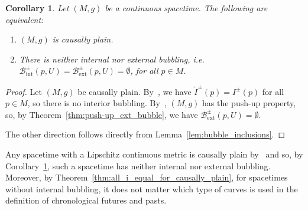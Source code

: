 \documentclass[reqno]{amsart}
\numberwithin{equation}{section}
\theoremstyle{plain}
\newtheorem{corollary}[theorem]{Corollary}
\theoremstyle{definition}
\theoremstyle{remark}
\begin{document}
\begin{corollary}
\label{cor:2.15}
Let $(M, g)$ be a continuous spacetime. The following are equivalent: 
\begin{enumerate}[label={(\roman*)}]
\item $(M, g)$ is causally plain. 
\item There is neither internal nor external bubbling, i.e. $\mathcal{B}^{\pm}_{\mathrm{int}}(p,U) = \mathcal{B}^{\pm}_{\mathrm{ext}}(p,U)=\emptyset$, for all $p \in M$. 
\end{enumerate}
\end{corollary}
\begin{proof}
Let $(M, g)$ be causally plain. By~\cite[Prop.~1.21]{CG:12}, we have $\check{I}^{\pm}(p) = I^{\pm}(p)$ for all $p \in M$, so there is no interior bubbling. By~\cite[Lemma~1.22]{CG:12}, $(M, g)$ has the push-up property, so, by Theorem~\ref{thm:push-up_ext_bubble}, we have $\mathcal{B}^{\pm}_{\mathrm{ext}}(p,U) = \emptyset$. 

The other direction follows directly from Lemma~\ref{lem:bubble_inclusions}. 
\end{proof}

Any spacetime with a Lipschitz continuous metric is causally plain by~\cite[Cor.\ 1.17]{CG:12} and so, by 
Corollary~\ref{cor:2.15}, such a spacetime has neither internal nor external bubbling. Moreover, by 
Theorem~\ref{thm:all_i_equal_for_causally_plain}, for spacetimes without internal bubbling, it does not matter which type of curves is used in the definition of chronological futures and pasts.
\end{document}
